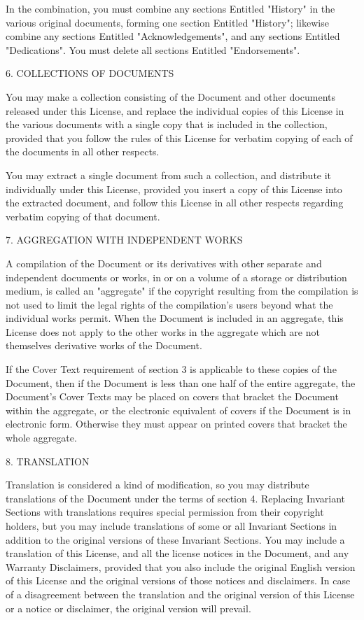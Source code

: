 \documentclass{article}
\begin{document}
In the combination, you must combine any sections Entitled "History" in the various original documents, forming one section Entitled "History"; likewise combine any sections Entitled "Acknowledgements", and any sections Entitled "Dedications".  You must delete all sections Entitled "Endorsements". 

6. COLLECTIONS OF DOCUMENTS 

You may make a collection consisting of the Document and other documents released under this License, and replace the individual copies of this License in the various documents with a single copy that is included in the collection, provided that you follow the rules of this License for verbatim copying of each of the documents in all other respects. 

You may extract a single document from such a collection, and distribute it individually under this License, provided you insert a copy of this License into the extracted document, and follow this License in all other respects regarding verbatim copying of that document. 

7. AGGREGATION WITH INDEPENDENT WORKS 

A compilation of the Document or its derivatives with other separate and independent documents or works, in or on a volume of a storage or distribution medium, is called an "aggregate" if the copyright resulting from the compilation is not used to limit the legal rights of the compilation's users beyond what the individual works permit. When the Document is included in an aggregate, this License does not apply to the other works in the aggregate which are not themselves derivative works of the Document. 

If the Cover Text requirement of section 3 is applicable to these copies of the Document, then if the Document is less than one half of the entire aggregate, the Document's Cover Texts may be placed on covers that bracket the Document within the aggregate, or the electronic equivalent of covers if the Document is in electronic form. Otherwise they must appear on printed covers that bracket the whole aggregate. 

8. TRANSLATION 

Translation is considered a kind of modification, so you may distribute translations of the Document under the terms of section 4. Replacing Invariant Sections with translations requires special permission from their copyright holders, but you may include translations of some or all Invariant Sections in addition to the original versions of these Invariant Sections. You may include a translation of this License, and all the license notices in the Document, and any Warranty Disclaimers, provided that you also include the original English version of this License and the original versions of those notices and disclaimers. In case of a disagreement between the translation and the original version of this License or a notice or disclaimer, the original version will prevail. 
\end{document}
